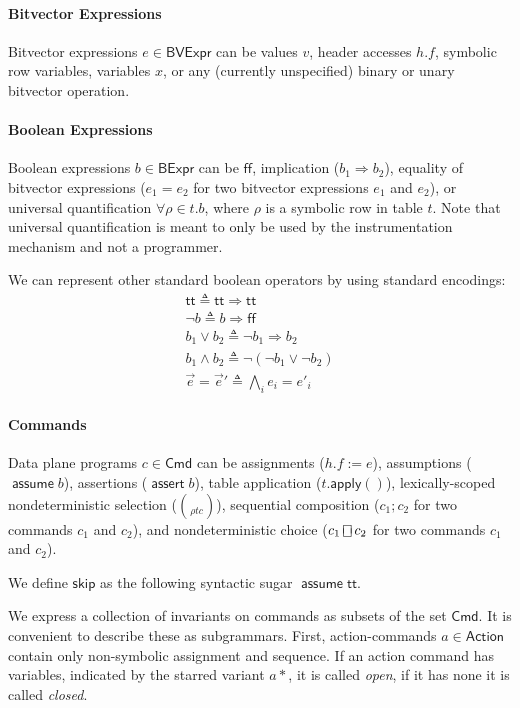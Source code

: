 \documentclass{article}
\newcommand{\TRUE}{\mathsf{tt}}
\newcommand{\FALSE}{\mathsf{ff}}
\newcommand{\BVExpr}{\mathsf{BVExpr}}
\newcommand{\BExpr}{\mathsf{BExpr}}
\newcommand{\Cmd}{\mathsf{Cmd}}
\newcommand{\Action}{\mathsf{Action}}
\newcommand{\assert}{\mathop{\mathsf{assert}}}
\newcommand{\assume}{\mathop{\mathsf{assume}}}
\newcommand{\apply}{\mathsf{apply}}
\newcommand{\choiceop}{\rotatebox[origin=c]{90}{$\sqsubset\!\!\!\sqsupset$}}
\newcommand{\choice}{\mathbin{\choiceop}}
\newcommand{\SKIP}{\mathsf{skip}}
\begin{document}
\paragraph{Bitvector Expressions}
Bitvector expressions $e \in \BVExpr$ can be values $v$, header accesses $h.f$,
symbolic row variables, variables $x$, or any
(currently unspecified) binary or unary bitvector operation.

\paragraph{Boolean Expressions}
Boolean expressions $b \in \BExpr$ can be $\FALSE$, implication ($b_1
\Rightarrow b_2$), equality of bitvector expressions ($e_1 = e_2$ for two
bitvector expressions $e_1$ and $e_2$), or universal quantification $\forall
\rho \in t. b$, where $\rho$ is a symbolic row in table $t$. Note that universal
quantification is meant to only be used by the instrumentation mechanism and not
a programmer.

We can represent other standard boolean operators by using standard encodings:
\[\begin{array}{l}
  \TRUE \triangleq \TRUE \Rightarrow \TRUE \\
  \neg b \triangleq b \Rightarrow \FALSE \\
  b_1 \vee b_2 \triangleq \neg b_1 \Rightarrow b_2 \\
  b_1 \wedge b_2 \triangleq \neg(\neg b_1 \vee \neg b_2) \\
  \vec e = \vec e' \triangleq \bigwedge_i e_i = e'_i
\end{array}\]

\paragraph{Commands}
Data plane programs $c \in \mathsf{Cmd}$ can be assignments ($h.f := e$),
assumptions ($\assume b$), assertions ($\assert b$), table application
($t.\apply()$), lexically-scoped nondeterministic selection ($\choose \rho t
c$), sequential composition ($c_1;c_2$ for two commands $c_1$ and $c_2$), and
nondeterministic choice ($c_1 \choice c_2$ for two commands $c_1$ and $c_2$).

We define $\SKIP$ as the following syntactic sugar $\assume \TRUE$.

We express a collection of invariants on commands as subsets of the set $\Cmd$.
It is convenient to describe these as subgrammars. First, action-commands $a \in
\Action$ contain only non-symbolic assignment and sequence. If an action
command has variables, indicated by the starred variant $a*$, it is called
\emph{open}, if it has none it is called \emph{closed}.
\end{document}
